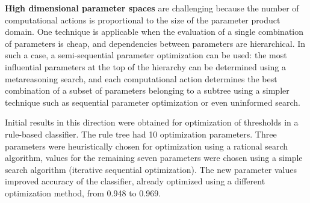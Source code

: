 {\bf High dimensional parameter spaces} are challenging because
the number of computational actions is proportional to the size of the
parameter product domain. One technique is applicable when the evaluation
of a single combination of parameters is cheap, and dependencies
between parameters are hierarchical. In such a case, a semi-sequential
parameter optimization can be used: the most
influential parameters at the top of the hierarchy can be determined
using a metareasoning search, and each computational action determines
the best combination of a subset of parameters belonging to a subtree
using a simpler technique such as sequential parameter optimization or
even uninformed search. 

Initial results in this direction were obtained for optimization
of thresholds in a rule-based classifier.  The rule tree had 10
optimization parameters. Three parameters were heuristically chosen
for optimization using a rational search algorithm, values for the remaining
seven parameters were chosen using a simple search algorithm
(iterative sequential optimization). The new parameter values improved
accuracy of the classifier, already optimized using a different
optimization method, from 0.948 to 0.969.